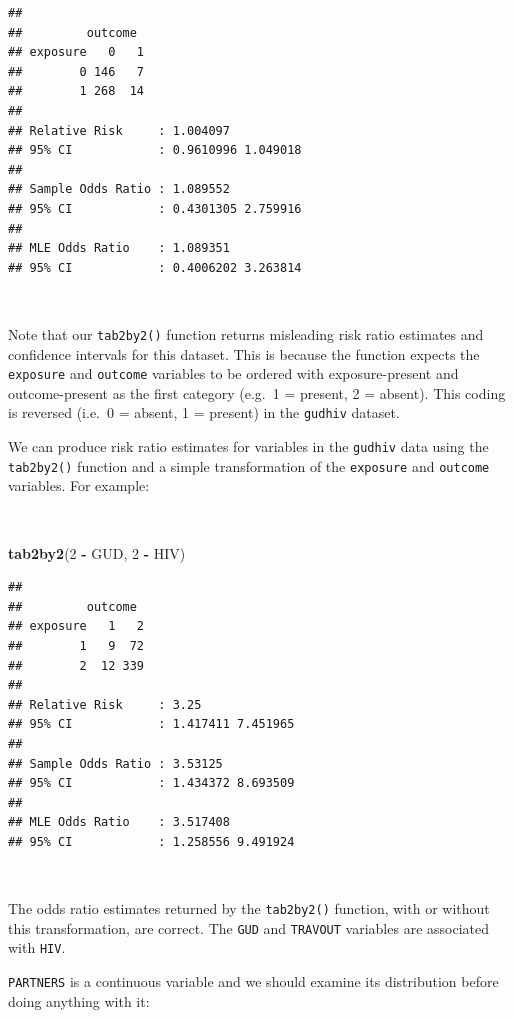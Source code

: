 \documentclass[12pt,a4paper]{book}
\newenvironment{Shaded}{\begin{snugshade}}{\end{snugshade}}
\newcommand{\DecValTok}[1]{\textcolor[rgb]{0.00,0.00,0.81}{#1}}
\newcommand{\KeywordTok}[1]{\textcolor[rgb]{0.13,0.29,0.53}{\textbf{#1}}}
\newcommand{\NormalTok}[1]{#1}
\newcommand{\OperatorTok}[1]{\textcolor[rgb]{0.81,0.36,0.00}{\textbf{#1}}}
\newcommand{\StringTok}[1]{\textcolor[rgb]{0.31,0.60,0.02}{#1}}
\theoremstyle{definition}
\theoremstyle{definition}
\theoremstyle{definition}
\theoremstyle{remark}
\begin{document}
\begin{verbatim}
## 
##         outcome
## exposure   0   1
##        0 146   7
##        1 268  14
## 
## Relative Risk     : 1.004097 
## 95% CI            : 0.9610996 1.049018 
## 
## Sample Odds Ratio : 1.089552 
## 95% CI            : 0.4301305 2.759916 
## 
## MLE Odds Ratio    : 1.089351 
## 95% CI            : 0.4006202 3.263814
\end{verbatim}

~

Note that our \texttt{tab2by2()} function returns misleading risk ratio
estimates and confidence intervals for this dataset. This is because the
function expects the \texttt{exposure} and \texttt{outcome} variables to
be ordered with exposure-present and outcome-present as the first
category (e.g.~1 = present, 2 = absent). This coding is reversed (i.e.~0
= absent, 1 = present) in the \texttt{gudhiv} dataset.

\newpage

We can produce risk ratio estimates for variables in the \texttt{gudhiv}
data using the \texttt{tab2by2()} function and a simple transformation
of the \texttt{exposure} and \texttt{outcome} variables. For example:

~

\begin{Shaded}
\begin{Highlighting}[]
\KeywordTok{tab2by2}\NormalTok{(}\DecValTok{2} \OperatorTok{-}\StringTok{ }\NormalTok{GUD, }\DecValTok{2} \OperatorTok{-}\StringTok{ }\NormalTok{HIV)}
\end{Highlighting}
\end{Shaded}

\begin{verbatim}
## 
##         outcome
## exposure   1   2
##        1   9  72
##        2  12 339
## 
## Relative Risk     : 3.25 
## 95% CI            : 1.417411 7.451965 
## 
## Sample Odds Ratio : 3.53125 
## 95% CI            : 1.434372 8.693509 
## 
## MLE Odds Ratio    : 3.517408 
## 95% CI            : 1.258556 9.491924
\end{verbatim}

~

The odds ratio estimates returned by the \texttt{tab2by2()} function,
with or without this transformation, are correct. The \texttt{GUD} and
\texttt{TRAVOUT} variables are associated with \texttt{HIV}.

\texttt{PARTNERS} is a continuous variable and we should examine its
distribution before doing anything with it:
\end{document}
